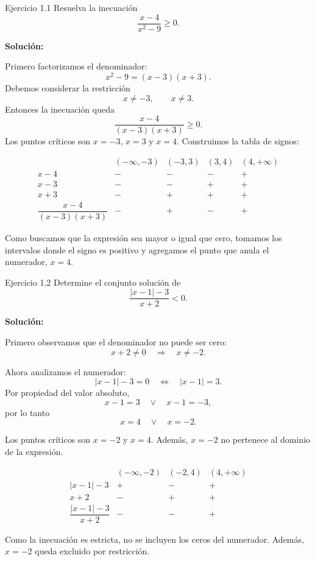 \documentclass[letterpaper, 12pt]{article}
\begin{document}

\begin{solucionbox}{Ejercicio 1.1}
Resuelva la inecuaci\'on
\[
    \frac{x-4}{x^2-9}\geq 0.
\]

\textbf{Soluci\'on:}

Primero factorizamos el denominador:
\[
    x^2-9=(x-3)(x+3).
\]
Debemos considerar la restricci\'on
\[
    x\neq -3,\qquad x\neq 3.
\]
Entonces la inecuaci\'on queda
\[
    \frac{x-4}{(x-3)(x+3)}\geq 0.
\]
Los puntos cr\'iticos son $x=-3$, $x=3$ y $x=4$. Construimos la tabla de signos:

\[
\begin{array}{c|cccc}
    & (-\infty,-3) & (-3,3) & (3,4) & (4,+\infty) \\ \hline
    x-4 & - & - & - & + \\
    x-3 & - & - & + & + \\
    x+3 & - & + & + & + \\ \hline
    \dfrac{x-4}{(x-3)(x+3)} & - & + & - & +
\end{array}
\]

Como buscamos que la expresi\'on sea mayor o igual que cero, tomamos los intervalos donde el signo es positivo y agregamos el punto que anula el numerador, $x=4$.

\respuesta{$x\in(-3,3)\cup[4,+\infty)$.}
\end{solucionbox}

\begin{solucionbox}{Ejercicio 1.2}
Determine el conjunto soluci\'on de
\[
    \frac{|x-1|-3}{x+2}<0.
\]

\textbf{Soluci\'on:}

Primero observamos que el denominador no puede ser cero:
\[
    x+2\neq 0 \quad\Longrightarrow\quad x\neq -2.
\]

Ahora analizamos el numerador:
\[
    |x-1|-3=0
    \quad\Longleftrightarrow\quad
    |x-1|=3.
\]
Por propiedad del valor absoluto,
\[
    x-1=3 \quad \vee \quad x-1=-3,
\]
por lo tanto
\[
    x=4 \quad \vee \quad x=-2.
\]

Los puntos cr\'iticos son $x=-2$ y $x=4$. Adem\'as, $x=-2$ no pertenece al dominio de la expresi\'on.

\[
\begin{array}{c|ccc}
    & (-\infty,-2) & (-2,4) & (4,+\infty) \\ \hline
    |x-1|-3 & + & - & + \\
    x+2 & - & + & + \\ \hline
    \dfrac{|x-1|-3}{x+2} & - & - & +
\end{array}
\]

Como la inecuaci\'on es estricta, no se incluyen los ceros del numerador. Adem\'as, $x=-2$ queda excluido por restricci\'on.

\end{solucionbox}
\end{document}
